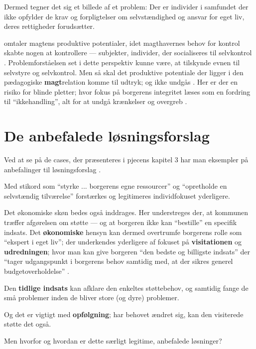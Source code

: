 Dermed tegner det sig et billede af et problem: Der er individer i samfundet der ikke opfylder de krav og forpligtelser om selvstændighed og ansvar for eget liv, deres rettigheder forudsætter.

\citeauthor{foucaultOvervagningOgStraf2005} omtaler magtens produktive potentialer, idet magthavernes behov for kontrol skabte nogen at kontrollere --- subjekter, individer, der socialiseres til selvkontrol \autocite{foucaultOvervagningOgStraf2005}.
Problemforståelsen set i dette perspektiv kunne være, at tilskynde evnen til selvstyre og selvkontrol.
Men så skal det produktive potentiale der ligger i den pædagogiske \textbf{magt}relation komme til udtryk; og ikke undgås \autocite{hurFrigorelsensMagt2015}.
Her er der en risiko for blinde pletter; hvor fokus på borgerens integritet læses som en fordring til “ikkehandling”, alt for at undgå krænkelser og overgreb \autocite{langagerDetAfmalteLiv2013}.

\section{De anbefalede løsningsforslag}
Ved at se på de cases, der præsenteres i pjecens kapitel 3 har man eksempler på anbefalinger til løsningsforslag \autocite[ss. 18-40]{klStyringAfDet2017}.

Med stikord som “styrke ... borgerens egne ressourcer” og “opretholde en selvstændig tilværelse” forstærkes og legitimeres individfokuset yderligere.

Det økonomiske skøn bedes også inddrages. Her understreges der, at kommunen træffer afgørelsen om støtte — og at borgeren ikke kan “bestille” en specifik indsats. Det \textbf{økonomiske} hensyn kan dermed overtrumfe borgerens rolle som “ekspert i eget liv”; der underkendes yderligere af fokuset på \textbf{visitationen} og \textbf{udredningen}; hvor man kan give borgeren “den bedste og billigste indsats” der “tager udgangspunkt i borgerens behov samtidig med, at der sikres generel budgetoverholdelse” .

Den \textbf{tidlige indsats} kan afklare den enkeltes støttebehov, og samtidig fange de små problemer inden de bliver store (og dyre) problemer.

Og det er vigtigt med \textbf{opfølgning}; har behovet ændret sig, kan den visiterede støtte det også.

Men hvorfor og hvordan er dette særligt legitime, anbefalede løsninger? 

